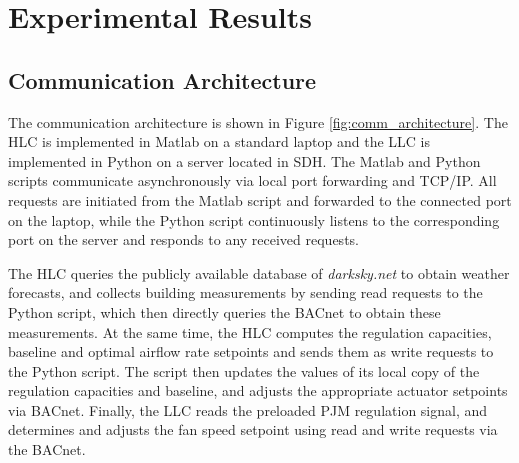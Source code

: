 %
%


\section{Experimental Results}\label{sec:results}



\subsection{Communication Architecture}\label{sec:comm}

The communication architecture is shown in Figure \ref{fig:comm_architecture}.
The HLC is implemented in Matlab on a standard laptop and the LLC is implemented in Python on a server located in SDH.
The Matlab and Python scripts communicate asynchronously via local port forwarding and TCP/IP.
All requests are initiated from the Matlab script and forwarded to the connected port on the laptop, while the Python script continuously listens to the corresponding port on the server and responds to any received requests.

The HLC queries the publicly available database of \textit{darksky.net} to obtain weather forecasts, and collects building measurements by sending read requests to the Python script, which then directly queries the BACnet to obtain these measurements. 
At the same time, the HLC computes the regulation capacities, baseline and optimal airflow rate setpoints and sends them as write requests to the Python script. The script then updates the values of its local copy of the regulation capacities and baseline, and adjusts the appropriate actuator setpoints via BACnet.
Finally, the LLC reads the preloaded PJM regulation signal, and determines and adjusts the fan speed setpoint using read and write requests via the BACnet.  


